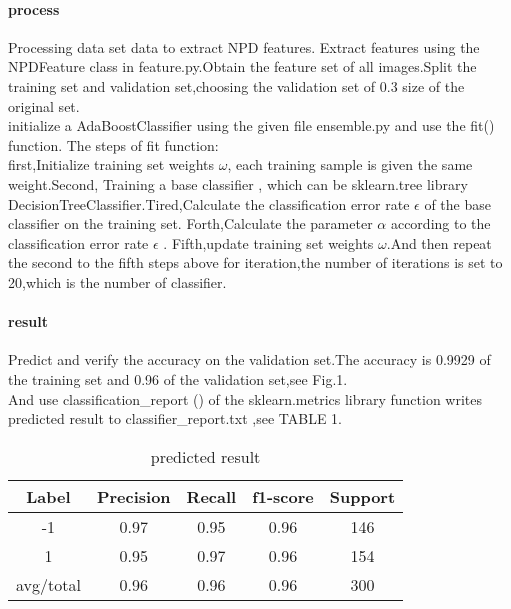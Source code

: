 \documentclass[journal, a4paper]{IEEEtran}
\begin{document}
\paragraph{process}
Processing data set data to extract NPD features. Extract features using the NPDFeature class in feature.py.Obtain the feature set of all images.Split the training set and validation set,choosing the validation set of 0.3 size of the original set.\\
initialize a AdaBoostClassifier using the given file ensemble.py and use the fit() function.
The steps of fit function:\\first,Initialize training set weights $\omega$, each training sample is given the same weight.Second, Training a base classifier , which can be sklearn.tree library DecisionTreeClassifier.Tired,Calculate the classification error rate $\epsilon$ of the base classifier on the training set. Forth,Calculate the parameter   $\alpha$ according to the classification error rate $\epsilon$ . Fifth,update training set weights $\omega$.And then repeat the second to the fifth steps above for iteration,the number of iterations is set to 20,which is the number of classifier.
\paragraph{result}
Predict and verify the accuracy on the validation set.The accuracy is 0.9929 of the training set and 0.96 of the validation set,see Fig.1.
\\And use classification\_report () of the sklearn.metrics library function writes predicted result to classifier\_report.txt ,see TABLE 1.

\begin{table}[!hbt]
		\begin{center}
		\caption{predicted result}
		\label{tab:simParameters}
		\begin{tabular}{|c|c|c|c|c|}
			\hline
			Label & Precision &  Recall & f1-score & Support\\
			\hline
			-1 & 0.97 & 0.95 & 0.96 & 146\\
			\hline
			1  & 0.95 & 0.97 & 0.96 & 154\\
			\hline
			avg/total & 0.96 & 0.96 & 0.96 & 300\\
			\hline
		\end{tabular}
		\end{center}
	\end{table}
\end{document}
